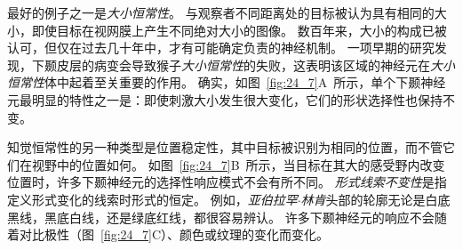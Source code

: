 最好的例子之一是\textit{大小恒常性}。
与观察者不同距离处的目标被认为具有相同的大小，即使目标在视网膜上产生不同绝对大小的图像。
数百年来，大小的构成已被认可，但仅在过去几十年中，才有可能确定负责的神经机制。
一项早期的研究发现，下颞皮层的病变会导致猴子\textit{大小恒常性}的失败，这表明该区域的神经元在\textit{大小恒常性}体中起着至关重要的作用。
确实，如图~\ref{fig:24_7}A~所示，单个下颞神经元最明显的特性之一是：即使刺激大小发生很大变化，它们的形状选择性也保持不变。


知觉恒常性的另一种类型是位置稳定性，其中目标被识别为相同的位置，而不管它们在视野中的位置如何。
如图~\ref{fig:24_7}B~所示，当目标在其大的感受野内改变位置时，许多下颞神经元的选择性响应模式不会有所不同。
\textit{形式线索不变性}是指定义形式变化的线索时形式的恒定。
例如，\textit{亚伯拉罕$\cdot$林肯}头部的轮廓无论是白底黑线，黑底白线，还是绿底红线，都很容易辨认。
许多下颞神经元的响应不会随着对比极性（图~\ref{fig:24_7}C）、颜色或纹理的变化而变化。


